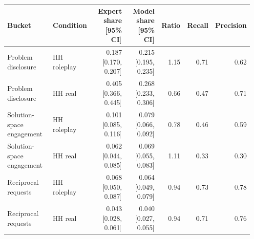 \begin{tabular}{llrrrrr}
\toprule
Bucket & Condition & Expert share [95\% CI] & Model share [95\% CI] & Ratio & Recall & Precision \\
\midrule
Problem disclosure & HH roleplay & 0.187 [0.170, 0.207] & 0.215 [0.195, 0.235] & 1.15 & 0.71 & 0.62 \\
Problem disclosure & HH real & 0.405 [0.366, 0.445] & 0.268 [0.233, 0.306] & 0.66 & 0.47 & 0.71 \\
Solution-space engagement & HH roleplay & 0.101 [0.085, 0.116] & 0.079 [0.066, 0.092] & 0.78 & 0.46 & 0.59 \\
Solution-space engagement & HH real & 0.062 [0.044, 0.085] & 0.069 [0.055, 0.083] & 1.11 & 0.33 & 0.30 \\
Reciprocal requests & HH roleplay & 0.068 [0.050, 0.087] & 0.064 [0.049, 0.079] & 0.94 & 0.73 & 0.78 \\
Reciprocal requests & HH real & 0.043 [0.028, 0.061] & 0.040 [0.027, 0.055] & 0.94 & 0.71 & 0.76 \\
\bottomrule
\end{tabular}
